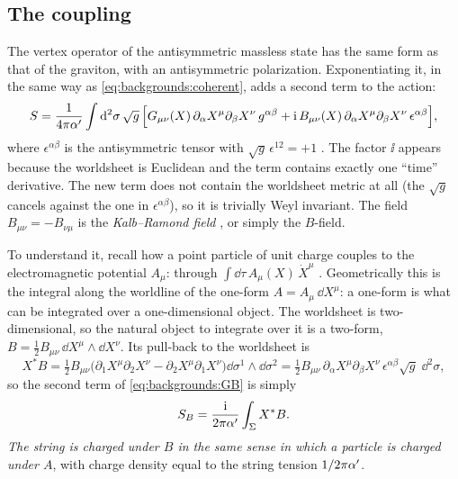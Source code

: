 \subsection{The coupling}

The vertex operator of the antisymmetric massless state has the same form as that of the
graviton, with an antisymmetric polarization. Exponentiating it, in the same way as
\eqref{eq:backgrounds:coherent}, adds a second term to the action:
\begin{equation}\label{eq:backgrounds:GB}
  S=\frac{1}{4\pi\alpha'}\int\mathrm{d}^2\sigma\,\sqrt g\,\Bigl[G_{\mu\nu}(X)\,
  \partial_\alpha X^\mu\partial_\beta X^\nu\,g^{\alpha\beta}
  +\mathrm{i}\,B_{\mu\nu}(X)\,\partial_\alpha X^\mu\partial_\beta X^\nu\,\epsilon^{\alpha\beta}\Bigr],
\end{equation}
where $\epsilon^{\alpha\beta}$ is the antisymmetric tensor with $\sqrt g\,\epsilon^{12}=+1$
.
The factor $\ii$ appears because the worldsheet is Euclidean and the term contains exactly
one ``time'' derivative. The new term does not contain the worldsheet metric at all (the
$\sqrt g$ cancels against the one in $\epsilon^{\alpha\beta}$), so it is trivially Weyl
invariant. The field $B_{\mu\nu}=-B_{\nu\mu}$ is the \emph{Kalb--Ramond field}%
, or simply the $B$-field.

To understand it, recall how a point particle of unit charge couples to the electromagnetic
potential $A_\mu$: through $\int\dd\tau\,A_\mu(X)\,\dot X^\mu$
. Geometrically this is the integral along the worldline
of the one-form $A=A_\mu\,\dd X^\mu$: a one-form is what can be integrated over a
one-dimensional object. The worldsheet is two-dimensional, so the natural object to integrate
over it is a two-form, $B=\tfrac12B_{\mu\nu}\,\dd X^\mu\wedge\dd X^\nu$. Its pull-back to the
worldsheet is
\[
  X^*B=\tfrac12B_{\mu\nu}\bigl(\partial_1X^\mu\partial_2X^\nu-\partial_2X^\mu\partial_1X^\nu\bigr)
  \dd\sigma^1\wedge\dd\sigma^2
  =\tfrac12B_{\mu\nu}\,\partial_\alpha X^\mu\partial_\beta X^\nu\,\epsilon^{\alpha\beta}\sqrt g\;
  \dd^2\sigma ,
\]
so the second term of \eqref{eq:backgrounds:GB} is simply
\begin{equation}\label{eq:backgrounds:pullback}
  S_B=\frac{\mathrm{i}}{2\pi\alpha'}\int_\Sigma X^*B .
\end{equation}
\emph{The string is charged under $B$ in the same sense in which a particle is charged under
$A$}, with charge density equal to the string tension $1/2\pi\alpha'$.

